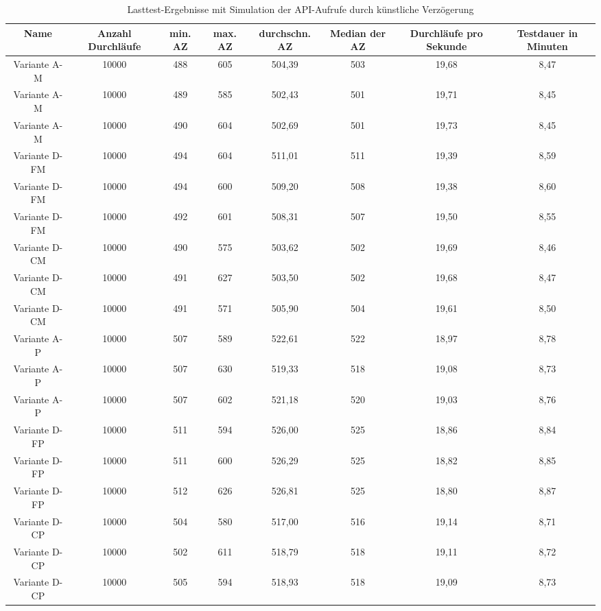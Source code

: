 \begin{anhang}
\begin{landscape}
	\begin{table}[h!]
		\centering
		\small
		\vspace{1cm}
		\begin{tabular}{ |c|c|c|c|c|c|c|c|} 
			\hline
			Name & Anzahl Durchläufe & min. AZ & max. AZ & durchschn. AZ & Median der AZ & Durchläufe pro Sekunde & Testdauer in Minuten\\ 
			\hline
			Variante A-M & 10000 & 488 & 605 & 504,39 & 503 & 19,68 & 8,47 \\
			\hline
			Variante A-M & 10000 & 489 & 585 & 502,43 & 501 & 19,71 & 8,45 \\
			\hline
			Variante A-M & 10000 & 490 & 604 & 502,69 & 501 & 19,73 & 8,45 \\
			\hline
			Variante D-FM & 10000 & 494 & 604 & 511,01 & 511 & 19,39 & 8,59 \\
			\hline
			Variante D-FM & 10000 & 494 & 600 & 509,20 & 508 & 19,38 & 8,60 \\
			\hline
			Variante D-FM & 10000 & 492 & 601 & 508,31 & 507 & 19,50 & 8,55 \\
			\hline
			Variante D-CM & 10000 & 490 & 575 & 503,62 & 502 & 19,69 & 8,46 \\
			\hline
			Variante D-CM & 10000 & 491 & 627 & 503,50 & 502 & 19,68 & 8,47 \\
			\hline
			Variante D-CM & 10000 & 491 & 571 & 505,90 & 504 & 19,61 & 8,50 \\
			\hline
			Variante A-P & 10000 & 507 & 589 & 522,61 & 522 & 18,97 & 8,78 \\
			\hline
			Variante A-P & 10000 & 507 & 630 & 519,33 & 518 & 19,08 & 8,73 \\
			\hline
			Variante A-P & 10000 & 507 & 602 & 521,18 & 520 & 19,03 & 8,76 \\
			\hline
			Variante D-FP & 10000 & 511 & 594 & 526,00 & 525 & 18,86 & 8,84 \\
			\hline
			Variante D-FP & 10000 & 511 & 600 & 526,29 & 525 & 18,82 & 8,85 \\
			\hline
			Variante D-FP & 10000 & 512 & 626 & 526,81 & 525 & 18,80 & 8,87 \\
			\hline
			Variante D-CP & 10000 & 504 & 580 & 517,00 & 516 & 19,14 & 8,71 \\
			\hline
			Variante D-CP & 10000 & 502 & 611 & 518,79 & 518 & 19,11 & 8,72 \\
			\hline
			Variante D-CP & 10000 & 505 & 594 & 518,93 & 518 & 19,09 & 8,73 \\
			\hline
		\end{tabular}
	\caption{Lasttest-Ergebnisse mit Simulation der API-Aufrufe durch künstliche Verzögerung}
	\label{fig:performance-delay}
	\end{table}
\end{landscape}

\end{anhang}
